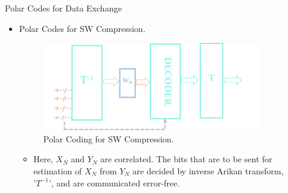 \documentclass[final,hyperref={pdfpagelabels=false}]{beamer}
\begin{document}
\begin{frame}[t]
\begin{columns}[t]
\begin{column}{.465\textwidth}
\begin{block}{Polar Codes for Data Exchange}
\begin{itemize}
\item Polar Codes for SW Compression.
\begin{figure}
\includegraphics[width=0.7\linewidth]{psw.png}
\caption{Polar Coding for SW Compression.}
\end{figure}
\begin{itemize}
\item Here, $X_{N}$ and $Y_{N}$ are correlated. The bits that are to be sent for estimation of $X_{N}$ from $Y_{N}$ are decided by inverse Arikan transform, '$T^{-1}$', and are communicated error-free.
\end{itemize}
\end{itemize}

\end{block}


\end{column} %

\begin{column}{.03\textwidth}\end{column} %
 
\begin{column}{.465\textwidth} %

            


\end{column}
\end{columns}
\end{frame}
\end{document}
